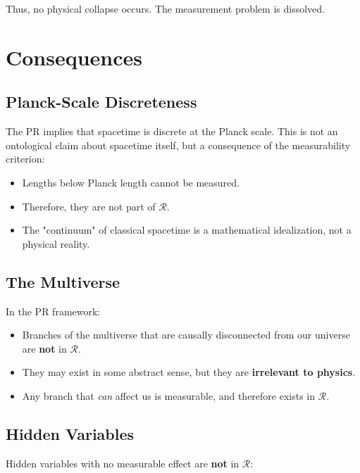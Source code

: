 \documentclass[aps,preprint,showpacs,showkeys]{revtex4}
\begin{document}
Thus, no physical collapse occurs. The measurement problem is dissolved.

\section{Consequences}

\subsection{Planck-Scale Discreteness}

The PR implies that spacetime is discrete at the Planck scale. This is not
an ontological claim about spacetime itself, but a consequence of the
measurability criterion:

\begin{itemize}
\item Lengths below Planck length cannot be measured.

\item Therefore, they are not part of $\mathcal{R}$.

\item The "continuum" of classical spacetime is a mathematical idealization,
not a physical reality.
\end{itemize}

\subsection{The Multiverse}

In the PR framework:

\begin{itemize}
\item Branches of the multiverse that are causally disconnected from our
universe are \textbf{not} in $\mathcal{R}$.

\item They may exist in some abstract sense, but they are \textbf{irrelevant
to physics}.

\item Any branch that \emph{can} affect us is measurable, and therefore
exists in $\mathcal{R}$.
\end{itemize}

\subsection{Hidden Variables}

Hidden variables with no measurable effect are \textbf{not} in $\mathcal{R}$:
\end{document}
